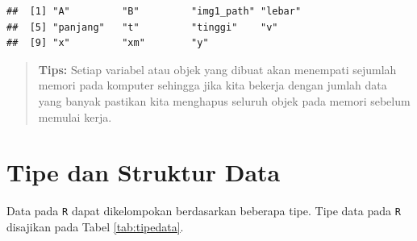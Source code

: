 \documentclass[
]{book}
\theoremstyle{definition}
\theoremstyle{definition}
\theoremstyle{definition}
\theoremstyle{definition}
\theoremstyle{remark}
\begin{document}
\begin{verbatim}
##  [1] "A"         "B"         "img1_path" "lebar"    
##  [5] "panjang"   "t"         "tinggi"    "v"        
##  [9] "x"         "xm"        "y"
\end{verbatim}

\begin{quote}
\textbf{Tips:} Setiap variabel atau objek yang dibuat akan menempati sejumlah memori pada komputer sehingga jika kita bekerja dengan jumlah data yang banyak pastikan kita menghapus seluruh objek pada memori sebelum memulai kerja.
\end{quote}

\hypertarget{typedata}{%
\section{Tipe dan Struktur Data}\label{typedata}}

Data pada \texttt{R} dapat dikelompokan berdasarkan beberapa tipe. Tipe data pada \texttt{R} disajikan pada Tabel \ref{tab:tipedata}.
\end{document}
